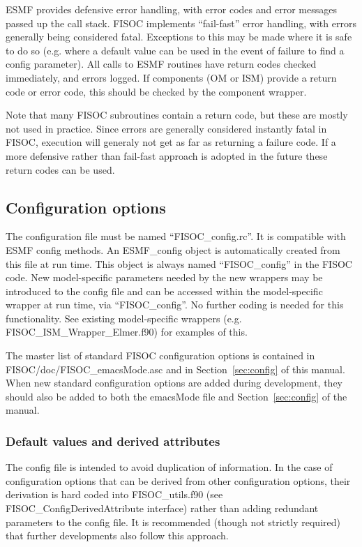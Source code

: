 \documentclass[12pt]{article}
\begin{document}
ESMF provides defensive error handling, with error codes and error messages passed up the 
call stack. 
FISOC implements ``fail-fast'' error handling, with errors generally being considered 
fatal. 
Exceptions to this may be made where it is safe to do so (e.g. where a default value can be 
used in the event of  failure to find a config parameter).
All calls to ESMF routines have return codes checked immediately, and errors logged.
If components (OM or ISM) provide a return code or error code, 
this should be checked by the component wrapper.

Note that many FISOC subroutines contain a return code, but these are mostly not used in 
practice.  Since errors are generally considered instantly fatal in FISOC, execution will 
generaly not get as far as returning a failure code. 
If a more defensive rather than fail-fast approach is adopted in the future these return 
codes can be used.



\subsection{Configuration options}

The configuration file must be named ``FISOC\_config.rc''.  
It is compatible with ESMF config methods.  
An ESMF\_config object is automatically created from this file at run time.
This object is always named ``FISOC\_config'' in the FISOC code.
New model-specific parameters needed by the new wrappers may be 
introduced to the config file and can be accessed 
within the model-specific wrapper at run time, via  ``FISOC\_config''. 
No further coding is needed for this functionality.
See existing model-specific wrappers (e.g. FISOC\_ISM\_Wrapper\_Elmer.f90) 
for examples of this.

The master list of standard FISOC configuration options is contained in 
FISOC/doc/FISOC\_emacsMode.asc and in Section~\ref{sec:config} of this 
manual. 
When new standard configuration options are added during development, they 
should also be added to both the emacsMode file and  
Section~\ref{sec:config} of the manual.


\subsubsection{Default values and derived attributes}

The config file is intended to avoid duplication of information.  
In the case of configuration options that can be derived from other 
configuration options, their derivation is hard coded into 
FISOC\_utils.f90 (see FISOC\_ConfigDerivedAttribute interface) 
rather than adding redundant parameters to the config file.
It is recommended (though not strictly required) that further developments 
also follow this approach. 
\end{document}
